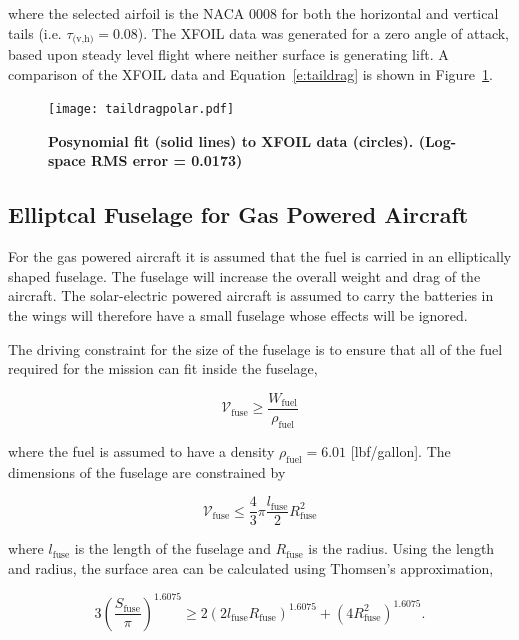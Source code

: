where the selected airfoil is the NACA 0008 for both the horizontal and vertical tails (i.e. $\tau_{\text{(v,h)}} = 0.08$). 
The XFOIL data was generated for a zero angle of attack, based upon steady level flight where neither surface is generating lift.  
A comparison of the XFOIL data and Equation~\eqref{e:taildrag} is shown in Figure~\ref{f:taildragpolar}.

\begin{figure}[H]
	\begin{center}
	\texttt{[image: taildragpolar.pdf]}
    \caption{\textbf{Posynomial fit (solid lines) to XFOIL data (circles). (Log-space RMS error = 0.0173)}}
	\label{f:taildragpolar}
	\end{center}
\end{figure}

\subsection{Elliptcal Fuselage for Gas Powered Aircraft}

For the gas powered aircraft it is assumed that the fuel is carried in an elliptically shaped fuselage.  The fuselage will increase the overall weight and drag of the aircraft.  The solar-electric powered aircraft is assumed to carry the batteries in the wings will therefore have a small fuselage whose effects will be ignored.  

The driving constraint for the size of the fuselage is to ensure that all of the fuel required for the mission can fit inside the fuselage, 

\begin{equation}
    \label{e:fusevol}
    \mathcal{V}_{\text{fuse}} \geq \frac{W_\text{fuel}}{\rho_\text{fuel}}
\end{equation}

where the fuel is assumed to have a density $\rho_\text{fuel} = 6.01$ [lbf/gallon].  The dimensions of the fuselage are constrained by

\begin{equation}
    \label{e:fusevol2}
    \mathcal{V}_{\text{fuse}} \leq \frac{4}{3}\pi \frac{l_{\text{fuse}}}{2}R_{\text{fuse}}^2
\end{equation}

where $l_{\text{fuse}}$ is the length of the fuselage and $R_{\text{fuse}}$ is the radius. Using the length and radius, the surface area can be calculated using Thomsen's approximation,\cite{ellipsoidSA}

\begin{equation}
    \label{e:fusesa}
    3 \left( \frac{S_{\text{fuse}}}{\pi} \right)^{1.6075} \geq 2(2l_{\text{fuse}}R_{\text{fuse}})^{1.6075} + (4R_{\text{fuse}}^2)^{1.6075}.
\end{equation}

